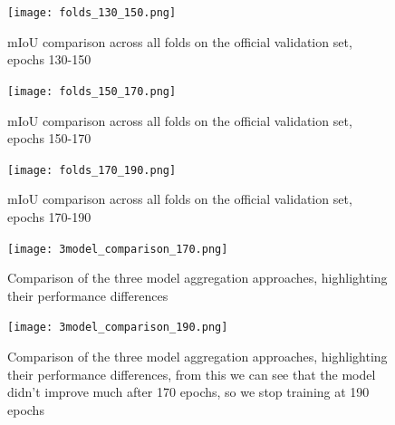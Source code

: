 \documentclass[]{article}
\begin{document}
\begin{figure}[htbp]
		\centering
		\texttt{[image: folds\_130\_150.png]}
		\caption{mIoU comparison across all folds on the official validation set, epochs 130-150}
		\label{fig:cross_val_130_150_val}
\end{figure}

\begin{figure}[htbp]
		\centering
		\texttt{[image: folds\_150\_170.png]}
		\caption{mIoU comparison across all folds on the official validation set, epochs 150-170}
		\label{fig:cross_val_150_170_val}
\end{figure}

\begin{figure}[htbp]
		\centering
		\texttt{[image: folds\_170\_190.png]}
		\caption{mIoU comparison across all folds on the official validation set, epochs 170-190}
		\label{fig:cross_val_170_190_val}
\end{figure}

\begin{figure}[htbp]
		\centering
		\texttt{[image: 3model\_comparison\_170.png]}
		\caption{Comparison of the three model aggregation approaches, highlighting their performance differences}
		\label{fig:3model_comparison}
\end{figure}

\begin{figure}[htbp]
		\centering
		\texttt{[image: 3model\_comparison\_190.png]}
		\caption{Comparison of the three model aggregation approaches, highlighting their performance differences, from this we can see that the model didn't improve much after 170 epochs, so we stop training at 190 epochs}
		\label{fig:3model_comparison_190}
\end{figure}
\end{document}
